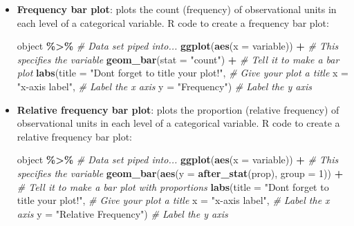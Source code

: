 \documentclass[
]{report}
\newenvironment{Shaded}{\begin{snugshade}}{\end{snugshade}}
\newcommand{\AttributeTok}[1]{\textcolor[rgb]{0.13,0.29,0.53}{#1}}
\newcommand{\CommentTok}[1]{\textcolor[rgb]{0.56,0.35,0.01}{\textit{#1}}}
\newcommand{\DecValTok}[1]{\textcolor[rgb]{0.00,0.00,0.81}{#1}}
\newcommand{\FunctionTok}[1]{\textcolor[rgb]{0.13,0.29,0.53}{\textbf{#1}}}
\newcommand{\NormalTok}[1]{#1}
\newcommand{\SpecialCharTok}[1]{\textcolor[rgb]{0.81,0.36,0.00}{\textbf{#1}}}
\newcommand{\StringTok}[1]{\textcolor[rgb]{0.31,0.60,0.02}{#1}}
\begin{document}
\begin{itemize}
\item
  \textbf{Frequency bar plot}: plots the count (frequency) of observational units in each level of a categorical variable. R code to create a frequency bar plot:

\begin{Shaded}
\begin{Highlighting}[]
\NormalTok{object }\SpecialCharTok{\%\textgreater{}\%} \CommentTok{\# Data set piped into...}
\FunctionTok{ggplot}\NormalTok{(}\FunctionTok{aes}\NormalTok{(}\AttributeTok{x =}\NormalTok{ variable)) }\SpecialCharTok{+}   \CommentTok{\# This specifies the variable}
\FunctionTok{geom\_bar}\NormalTok{(}\AttributeTok{stat =} \StringTok{"count"}\NormalTok{) }\SpecialCharTok{+}  \CommentTok{\# Tell it to make a bar plot}
\FunctionTok{labs}\NormalTok{(}\AttributeTok{title =} \StringTok{"Don\textquotesingle{}t forget to title your plot!"}\NormalTok{,  }
   \CommentTok{\# Give your plot a title}
   \AttributeTok{x =} \StringTok{"x{-}axis label"}\NormalTok{,   }\CommentTok{\# Label the x axis}
   \AttributeTok{y =} \StringTok{"Frequency"}\NormalTok{)  }\CommentTok{\# Label the y axis}
\end{Highlighting}
\end{Shaded}
\item
  \textbf{Relative frequency bar plot}: plots the proportion (relative frequency) of observational units in each level of a categorical variable. R code to create a relative frequency bar plot:

\begin{Shaded}
\begin{Highlighting}[]
\NormalTok{object }\SpecialCharTok{\%\textgreater{}\%} \CommentTok{\# Data set piped into...}
\FunctionTok{ggplot}\NormalTok{(}\FunctionTok{aes}\NormalTok{(}\AttributeTok{x =}\NormalTok{ variable)) }\SpecialCharTok{+}   \CommentTok{\# This specifies the variable}
\FunctionTok{geom\_bar}\NormalTok{(}\FunctionTok{aes}\NormalTok{(}\AttributeTok{y =} \FunctionTok{after\_stat}\NormalTok{(prop), }\AttributeTok{group =} \DecValTok{1}\NormalTok{)) }\SpecialCharTok{+}  \CommentTok{\# Tell it to make a bar plot with proportions}
\FunctionTok{labs}\NormalTok{(}\AttributeTok{title =} \StringTok{"Don\textquotesingle{}t forget to title your plot!"}\NormalTok{,  }
   \CommentTok{\# Give your plot a title}
   \AttributeTok{x =} \StringTok{"x{-}axis label"}\NormalTok{,   }\CommentTok{\# Label the x axis}
   \AttributeTok{y =} \StringTok{"Relative Frequency"}\NormalTok{)  }\CommentTok{\# Label the y axis}
\end{Highlighting}
\end{Shaded}
\end{itemize}
\end{document}
